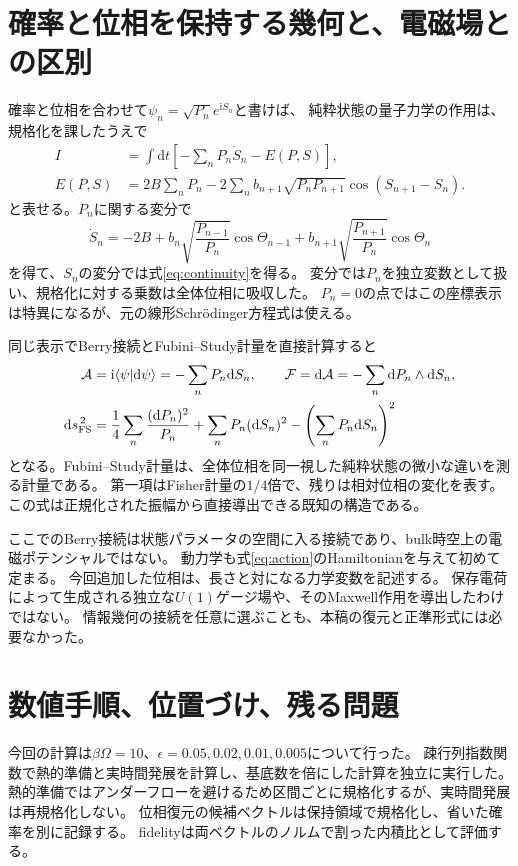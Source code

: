 \documentclass[a4paper,11pt]{ltjsarticle}
\numberwithin{equation}{section}
\newcommand{\dd}{\mathrm d}
\newcommand{\ii}{\mathrm i}
\begin{document}
\section{確率と位相を保持する幾何と、電磁場との区別}
確率と位相を合わせて$\psi_n=\sqrt{P_n}e^{\ii S_n}$と書けば、
純粋状態の量子力学の作用は、規格化を課したうえで
\begin{align}
 I&=\int\dd t\left[-\sum_nP_n\dot S_n-E(P,S)\right],\label{eq:action}\\
 E(P,S)&=2B\sum_nP_n-2\sum_n b_{n+1}\sqrt{P_nP_{n+1}}\cos(S_{n+1}-S_n).\label{eq:energyfunctional}
\end{align}
と表せる。$P_n$に関する変分で
\begin{equation}
 \dot S_n=-2B+
 b_n\sqrt{\frac{P_{n-1}}{P_n}}\cos\Theta_{n-1}
 +b_{n+1}\sqrt{\frac{P_{n+1}}{P_n}}\cos\Theta_n
 \label{eq:phasedot}
\end{equation}
を得て、$S_n$の変分では式\eqref{eq:continuity}を得る。
変分では$P_n$を独立変数として扱い、規格化に対する乗数は全体位相に吸収した。
$P_n=0$の点ではこの座標表示は特異になるが、元の線形Schr\"odinger方程式は使える。

同じ表示でBerry接続とFubini--Study計量を直接計算すると
\begin{align}
 \mathcal A&=\ii\langle\psi|\dd\psi\rangle=-\sum_nP_n\dd S_n,
 \qquad \mathcal F=\dd\mathcal A=-\sum_n\dd P_n\wedge\dd S_n,
 \label{eq:berry}\\
 \dd s_{\rm FS}^{\,2}
 &=\frac14\sum_n\frac{(\dd P_n)^2}{P_n}
 +\sum_nP_n(\dd S_n)^2-\left(\sum_nP_n\dd S_n\right)^2
 \label{eq:FS}
\end{align}
となる。Fubini--Study計量は、全体位相を同一視した純粋状態の微小な違いを測る計量である。
第一項はFisher計量の$1/4$倍で、残りは相対位相の変化を表す。
この式は正規化された振幅から直接導出できる既知の構造である。

ここでのBerry接続は状態パラメータの空間に入る接続であり、bulk時空上の電磁ポテンシャルではない。
動力学も式\eqref{eq:action}のHamiltonianを与えて初めて定まる。
今回追加した位相は、長さと対になる力学変数を記述する。
保存電荷によって生成される独立な$U(1)$ゲージ場や、そのMaxwell作用を導出したわけではない。
情報幾何の接続を任意に選ぶことも、本稿の復元と正準形式には必要なかった。

\section{数値手順、位置づけ、残る問題}
今回の計算は$\beta\Omega=10$、$\epsilon=0.05,0.02,0.01,0.005$について行った。
疎行列指数関数で熱的準備と実時間発展を計算し、基底数を倍にした計算を独立に実行した。
熱的準備ではアンダーフローを避けるため区間ごとに規格化するが、実時間発展は再規格化しない。
位相復元の候補ベクトルは保持領域で規格化し、省いた確率を別に記録する。
fidelityは両ベクトルのノルムで割った内積比として評価する。
\end{document}
